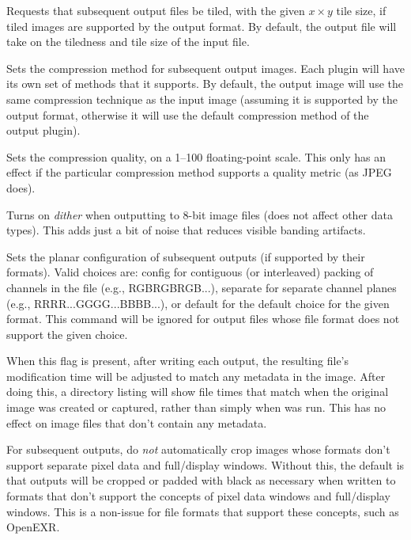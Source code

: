 \label{sec:oiiotool:tile}
Requests that subsequent output files be tiled, with the given $x \times y$ 
tile size, if tiled images are supported by the output format.
By default, the output file will take on the tiledness and tile size
of the input file.
\apiend

Sets the compression method for subsequent output images.  Each
\ImageOutput plugin will have its own set of methods that it supports.
By default, the output image will use the same compression technique as
the input image (assuming it is supported by the output format,
otherwise it will use the default compression method of the output
plugin).  
\apiend

Sets the compression quality, on a 1--100 floating-point scale.
This only has an effect if the particular compression method supports
a quality metric (as JPEG does).
\apiend

Turns on \emph{dither} when outputting to 8-bit image files (does not affect
other data types). This adds just a bit of noise that reduces visible
banding artifacts.
\apiend

Sets the planar configuration of subsequent outputs (if supported by
their formats).  Valid choices are: {\cf config} for contiguous (or
interleaved) packing of channels in the file (e.g., RGBRGBRGB...), 
{\cf separate} for separate channel planes (e.g.,
RRRR...GGGG...BBBB...), or {\cf default} for the default choice for the
given format.  This command will be ignored for output files whose 
file format does not support the given choice.
\apiend

When this flag is present, after writing each output, the resulting
file's modification time will be adjusted to match any 
metadata in the image.  After doing this, a directory listing will show
file times that match when the original image was created or captured,
rather than simply when \oiiotool was run.  This has no effect on
image files that don't contain any  metadata.
\apiend

For subsequent outputs, do \emph{not} automatically crop images whose
formats don't support separate pixel data and full/display windows.
Without this, the default is that outputs will be cropped or padded with
black as necessary when written to formats that don't support the
concepts of pixel data windows and full/display windows.  This is a
non-issue for file formats that support these concepts, such as OpenEXR.
\apiend

